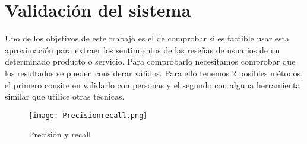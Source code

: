 \section{Validación del sistema}
Uno de los objetivos de este trabajo es el de comprobar si es factible usar esta aproximación 
para extraer los sentimientos de las reseñas de usuarios de un determinado producto o servicio.
Para comprobarlo necesitamos comprobar que los resultados se pueden considerar válidos.
Para ello tenemos 2 posibles métodos, el primero consite en validarlo con personas y el segundo 
con alguna herramienta similar que utilice otras técnicas.

\begin{figure}[h]
   \advance{} 
   \texttt{[image: Precisionrecall.png]}
   \caption{Precisión y recall}
\end{figure}

